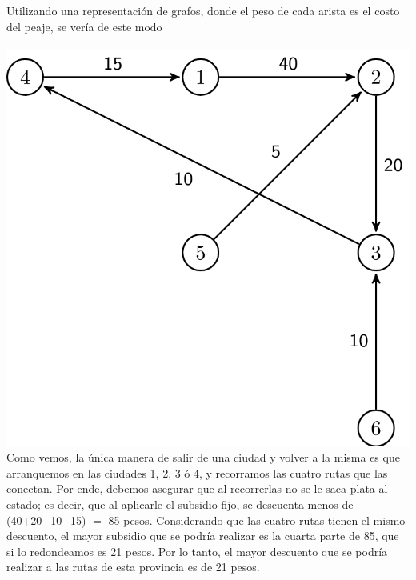 Utilizando una representación de grafos, donde el peso de cada arista es el costo del peaje, se vería de este modo
\\
\\
\includegraphics[scale=0.25]{imagenes/ejemplo2.png}
\\

Como vemos, la única manera de salir de una ciudad y volver a la misma es que arranquemos en las ciudades 1, 2, 3 ó 4, y recorramos las cuatro rutas que las conectan. Por ende, debemos asegurar que al recorrerlas no se le saca plata al estado; es decir, que al aplicarle el subsidio fijo, se descuenta menos de (40+20+10+15) $=$ 85 pesos. Considerando que las cuatro rutas tienen el mismo descuento, el mayor subsidio que se podría realizar es la cuarta parte de 85, que si lo redondeamos es 21 pesos. Por lo tanto, el mayor descuento que se podría realizar a las rutas de esta provincia es de 21 pesos.
\\
\par
